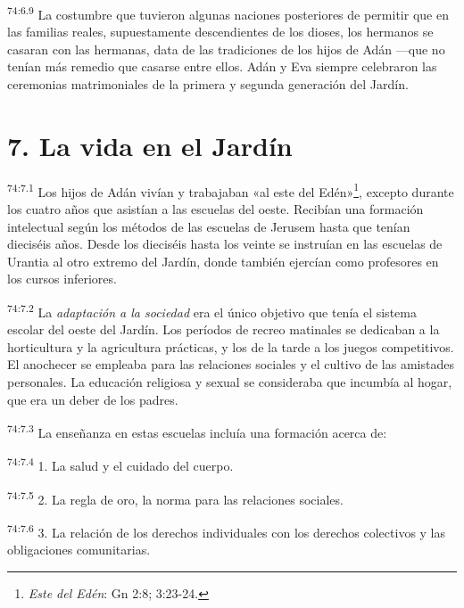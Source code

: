 \par
\textsuperscript{74:6.9} La costumbre que tuvieron algunas naciones posteriores de permitir que en las familias reales, supuestamente descendientes de los dioses, los hermanos se casaran con las hermanas, data de las tradiciones de los hijos de Adán ---que no tenían más remedio que casarse entre ellos. Adán y Eva siempre celebraron las ceremonias matrimoniales de la primera y segunda generación del Jardín.

\section*{7. La vida en el Jardín}
\par
\textsuperscript{74:7.1} Los hijos de Adán vivían y trabajaban «al este del Edén»\footnote{\textit{Este del Edén}: Gn 2:8; 3:23-24.}, excepto durante los cuatro años que asistían a las escuelas del oeste. Recibían una formación intelectual según los métodos de las escuelas de Jerusem hasta que tenían dieciséis años. Desde los dieciséis hasta los veinte se instruían en las escuelas de Urantia al otro extremo del Jardín, donde también ejercían como profesores en los cursos inferiores.

\par
\textsuperscript{74:7.2} La \textit{adaptación a la sociedad} era el único objetivo que tenía el sistema escolar del oeste del Jardín. Los períodos de recreo matinales se dedicaban a la horticultura y la agricultura prácticas, y los de la tarde a los juegos competitivos. El anochecer se empleaba para las relaciones sociales y el cultivo de las amistades personales. La educación religiosa y sexual se consideraba que incumbía al hogar, que era un deber de los padres.

\par
\textsuperscript{74:7.3} La enseñanza en estas escuelas incluía una formación acerca de:

\par
\textsuperscript{74:7.4} 1. La salud y el cuidado del cuerpo.

\par
\textsuperscript{74:7.5} 2. La regla de oro, la norma para las relaciones sociales.

\par
\textsuperscript{74:7.6} 3. La relación de los derechos individuales con los derechos colectivos y las obligaciones comunitarias.

